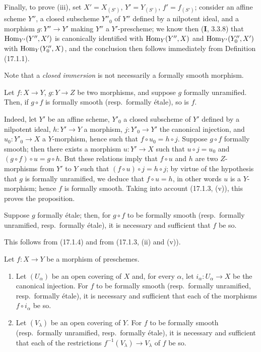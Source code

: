 Finally, to prove (iii), set $X'=X_{(S')}$, $Y'=Y_{(S')}$, $f'=f_{(S')}$; consider an affine scheme $Y''$, a closed subscheme $Y''_0$ of $Y''$ defined by a nilpotent ideal, and a morphism $g:Y''\to Y'$ making $Y''$ a $Y'$-prescheme; we know then (\textbf{I}, 3.3.8) that $\operatorname{Hom}_{Y'}(Y'',X')$ is canonically identified with $\operatorname{Hom}_Y(Y'',X)$ and $\operatorname{Hom}_{Y'}(Y''_0,X')$ with $\operatorname{Hom}_Y(Y''_0,X)$, and the conclusion then follows immediately from Definition (17.1.1).

Note that a \emph{closed immersion} is not necessarily a formally smooth morphism.

\begin{proposition}[17.1.4]
\label{IV.17.1.4}
Let $f:X\to Y$, $g:Y\to Z$ be two morphisms, and suppose $g$ formally unramified. Then, if $g\circ f$ is formally smooth \textup{(resp.}\ formally étale\textup{)}, so is $f$.
\end{proposition}

Indeed, let $Y'$ be an affine scheme, $Y'_0$ a closed subscheme of $Y'$ defined by a nilpotent ideal, $h:Y'\to Y$ a morphism, $j:Y'_0\to Y'$ the canonical injection, and $u_0:Y'_0\to X$ a $Y$-morphism, hence such that $f\circ u_0=h\circ j$. Suppose $g\circ f$ formally smooth; then there exists a morphism $u:Y'\to X$ such that $u\circ j=u_0$ and $(g\circ f)\circ u=g\circ h$. But these relations imply that $f\circ u$ and $h$ are two $Z$-morphisms from $Y'$ to $Y$ such that $(f\circ u)\circ j=h\circ j$; by virtue of the hypothesis that $g$ is formally unramified, we deduce that $f\circ u=h$, in other words $u$ is a $Y$-morphism; hence $f$ is formally smooth. Taking into account (17.1.3, (v)), this proves the proposition.

\begin{corollary}[17.1.5]
\label{IV.17.1.5}
Suppose $g$ formally étale; then, for $g\circ f$ to be formally smooth \textup{(resp.}\ formally unramified, \textup{resp.}\ formally étale\textup{)}, it is necessary and sufficient that $f$ be so.
\end{corollary}

This follows from (17.1.4) and from (17.1.3, (ii) and (v)).

\begin{proposition}[17.1.6]
\label{IV.17.1.6}
Let $f:X\to Y$ be a morphism of preschemes.
\begin{enumerate}
  \item[\textup{(i)}] Let $(U_\alpha)$ be an open covering of $X$ and, for every $\alpha$, let $i_\alpha:U_\alpha\to X$ be the canonical injection. For $f$ to be formally smooth \textup{(resp.}\ formally unramified, \textup{resp.}\ formally étale\textup{)}, it is necessary and sufficient that each of the morphisms $f\circ i_\alpha$ be so.
  \item[\textup{(ii)}] Let $(V_\lambda)$ be an open covering of $Y$. For $f$ to be formally smooth \textup{(resp.}\ formally unramified, \textup{resp.}\ formally étale\textup{)}, it is necessary and sufficient that each of the restrictions $f^{-1}(V_\lambda)\to V_\lambda$ of $f$ be so.
\end{enumerate}
\end{proposition}

